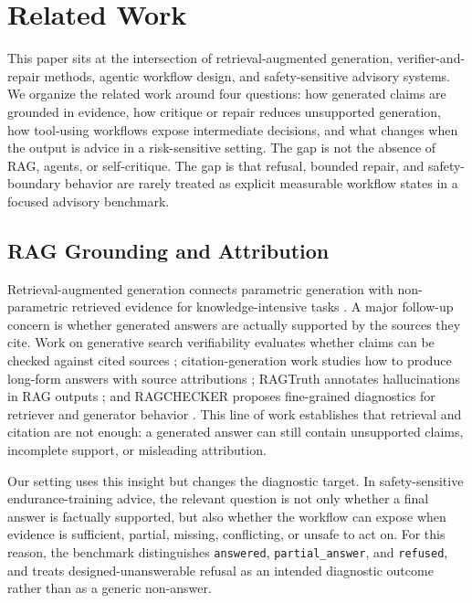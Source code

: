 \section{Related Work}

This paper sits at the intersection of retrieval-augmented generation, verifier-and-repair methods, agentic workflow design, and safety-sensitive advisory systems. We organize the related work around four questions: how generated claims are grounded in evidence, how critique or repair reduces unsupported generation, how tool-using workflows expose intermediate decisions, and what changes when the output is advice in a risk-sensitive setting. The gap is not the absence of RAG, agents, or self-critique. The gap is that refusal, bounded repair, and safety-boundary behavior are rarely treated as explicit measurable workflow states in a focused advisory benchmark.

\subsection{RAG Grounding and Attribution}

Retrieval-augmented generation connects parametric generation with non-parametric retrieved evidence for knowledge-intensive tasks \cite{lewis2020rag}. A major follow-up concern is whether generated answers are actually supported by the sources they cite. Work on generative search verifiability evaluates whether claims can be checked against cited sources \cite{liu2023verifiability}; citation-generation work studies how to produce long-form answers with source attributions \cite{gao2023alce}; RAGTruth annotates hallucinations in RAG outputs \cite{niu2023ragtruth}; and RAGCHECKER proposes fine-grained diagnostics for retriever and generator behavior \cite{ragchecker2024}. This line of work establishes that retrieval and citation are not enough: a generated answer can still contain unsupported claims, incomplete support, or misleading attribution.

Our setting uses this insight but changes the diagnostic target. In safety-sensitive endurance-training advice, the relevant question is not only whether a final answer is factually supported, but also whether the workflow can expose when evidence is sufficient, partial, missing, conflicting, or unsafe to act on. For this reason, the benchmark distinguishes \texttt{answered}, \texttt{partial\_answer}, and \texttt{refused}, and treats designed-unanswerable refusal as an intended diagnostic outcome rather than as a generic non-answer.

